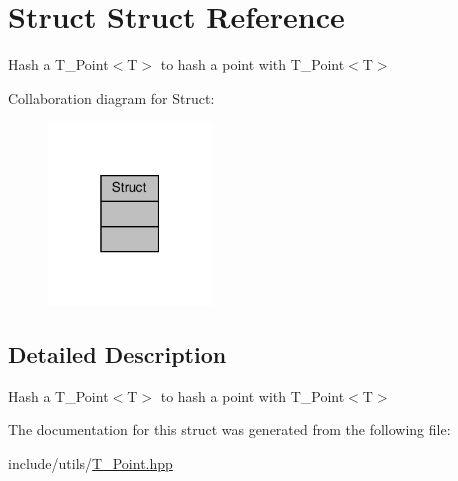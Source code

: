 \hypertarget{structStruct}{}\section{Struct Struct Reference}
\label{structStruct}


Hash a T\+\_\+\+Point$<$\+T$>$ to hash a point with T\+\_\+\+Point$<$\+T$>$  




Collaboration diagram for Struct\+:\nopagebreak
\begin{figure}[H]
\begin{center}
\leavevmode
\includegraphics[width=123pt]{structStruct__coll__graph}
\end{center}
\end{figure}


\subsection{Detailed Description}
Hash a T\+\_\+\+Point$<$\+T$>$ to hash a point with T\+\_\+\+Point$<$\+T$>$ 

The documentation for this struct was generated from the following file\+:\begin{DoxyCompactItemize}
\item 
include/utils/\hyperlink{utils_2T__Point_8hpp}{T\+\_\+\+Point.\+hpp}\end{DoxyCompactItemize}
